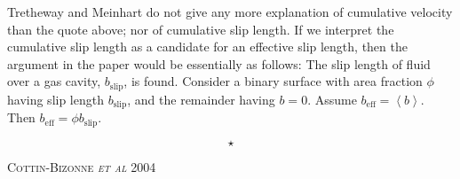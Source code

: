 \documentclass[12pt, a4paper, twoside, openright]{book}
\newcommand{\beff}{\ensuremath{b_{\mathrm{eff}}}}
\newcommand{\bmean}{\ensuremath{ \left< b \right> }}
\newcommand{\bslip}{\ensuremath{b_{\mathrm{slip}}}}
\newcommand{\sep}{\begin{equation*} \star \end{equation*}}
\newcommand{\paper}[1]
         {\colorbox[gray]{0.8}{ \textsc{#1}}
         
         }
\begin{document}
Tretheway and Meinhart do not give any more explanation of cumulative velocity than the  quote above; nor of cumulative slip length.  If we interpret the cumulative slip length as a candidate for an effective slip length, then the argument in the paper would be essentially as follows: The slip length of fluid over a gas cavity, $\bslip$, is found.  Consider a binary surface with area fraction $\phi$ having slip length $\bslip$, and the remainder having $b = 0$.  Assume $\beff = \bmean$.  Then $\beff = \phi \bslip$.



%
%

\sep

\paper{Cottin-Bizonne \emph{et al} 2004}
\end{document}
